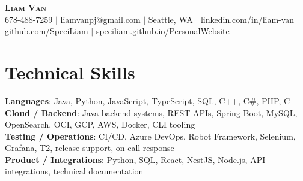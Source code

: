 \documentclass[letterpaper,11pt]{article}
\begin{document}

%
\begin{center}
    \textbf{\Huge \scshape Liam Van} \\ \vspace{1pt}
    \small 678-488-7259 $|$ \small {liamvanpj@gmail.com} $|$ Seattle, WA
 {{$|$ linkedin.com/in/liam-van} {$|$ github.com/SpeciLiam} {$|$ \href{https://speciliam.github.io/PersonalWebsite}{speciliam.github.io/PersonalWebsite}}}

\end{center}

\section{Technical Skills}
 \begin{itemize}[leftmargin=0.15in, label={}]
    \small{\item{
     \textbf{Languages}{: Java, Python, JavaScript, TypeScript, SQL, C++, C\#, PHP, C} \\
     \textbf{Cloud / Backend}{: Java backend systems, REST APIs, Spring Boot, MySQL, OpenSearch, OCI, GCP, AWS, Docker, CLI tooling} \\
     \textbf{Testing / Operations}{: CI/CD, Azure DevOps, Robot Framework, Selenium, Grafana, T2, release support, on-call response} \\
     \textbf{Product / Integrations}{: Python, SQL, React, NestJS, Node.js, API integrations, technical documentation} \\
    }}
 \end{itemize}
%
\end{document}
